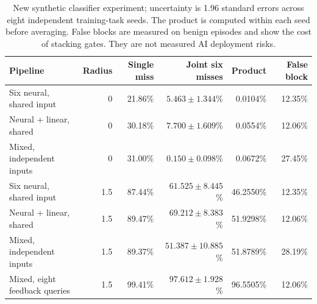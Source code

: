 \begin{table}[t]\centering\small\begin{tabularx}{\textwidth}{@{}Lrrrrr@{}}\toprule
Pipeline & Radius & Single miss & Joint six misses & Product & False block\\\midrule
Six neural, shared input & 0 & 21.86\% & $5.463\pm1.344$\% & 0.0104\% & 12.35\%\\
Neural + linear, shared & 0 & 30.18\% & $7.700\pm1.609$\% & 0.0554\% & 12.06\%\\
Mixed, independent inputs & 0 & 31.00\% & $0.150\pm0.098$\% & 0.0672\% & 27.45\%\\
Six neural, shared input & 1.5 & 87.44\% & $61.525\pm8.445$\% & 46.2550\% & 12.35\%\\
Neural + linear, shared & 1.5 & 89.47\% & $69.212\pm8.383$\% & 51.9298\% & 12.06\%\\
Mixed, independent inputs & 1.5 & 89.37\% & $51.387\pm10.885$\% & 51.8789\% & 28.19\%\\
Mixed, eight feedback queries & 1.5 & 99.41\% & $97.612\pm1.928$\% & 96.5505\% & 12.06\%\\
\bottomrule\end{tabularx}\caption{New synthetic classifier experiment; uncertainty is 1.96 standard errors across eight independent training-task seeds. The product is computed within each seed before averaging. False blocks are measured on benign episodes and show the cost of stacking gates. They are not measured AI deployment risks.}\label{tab:monitors}\end{table}
